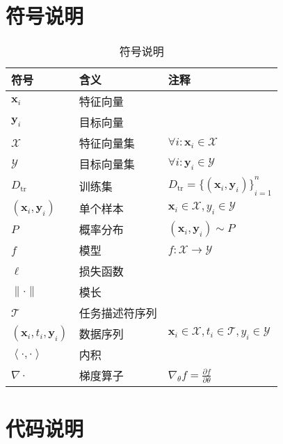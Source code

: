 \newpage
\appendix
\section{符号说明}
\label{sec:appendix-symbol}
\begin{table}[H]
    \centering
    \begin{tabularx}{0.95\textwidth}{>{\centering\arraybackslash}X>{\centering\arraybackslash}X>{\centering\arraybackslash}X}\toprule
        符号 & 含义 & 注释\\\midrule
        $\boldsymbol{x}_i$ & 特征向量 & \\\midrule
        $\boldsymbol{y}_i$ & 目标向量 & \\\midrule
        $\mathcal{X}$ & 特征向量集 & $\forall i:\boldsymbol{x}_i\in \mathcal{X}$ \\\midrule
        $\mathcal{Y}$ & 目标向量集 & $\forall i:\boldsymbol{y}_i\in \mathcal{Y}$ \\\midrule
        $D_{\text{tr}}$ & 训练集 & $D_{\text{tr}}={\{(\boldsymbol{x}_i, \boldsymbol{y}_i)\}}_{i=1}^{n}$\\\midrule
        $(\boldsymbol{x}_i, \boldsymbol{y}_i)$ & 单个样本 & $\boldsymbol{x}_i\in \mathcal{X}, y_i\in \mathcal{Y}$ \\\midrule 
        $P$ & 概率分布 & $(\boldsymbol{x}_i, \boldsymbol{y}_i)\sim P$ \\\midrule
        $f$ & 模型 & $f:\mathcal{X}\rightarrow \mathcal{Y}$ \\\midrule
        $\ell$ & 损失函数 &  \\\midrule
        $\|\cdot\|$ & 模长 &  \\\midrule
        $\mathcal{T}$ & 任务描述符序列 &  \\\midrule
        $(\boldsymbol{x}_i, t_i, \boldsymbol{y}_i)$ & 数据序列 & $\boldsymbol{x}_i\in \mathcal{X}, t_i\in \mathcal{T},y_i\in \mathcal{Y}$ \\\midrule
        $\left\langle\cdot,\cdot\right\rangle$ & 内积 &  \\\midrule
        $\nabla\cdot$ & 梯度算子 & $\nabla_\theta f=\frac{\partial f}{\partial\theta}$ \\\bottomrule
    \end{tabularx}
    \caption{符号说明}\label{tab:appendix-symbol}
\end{table}

\section{代码说明}

